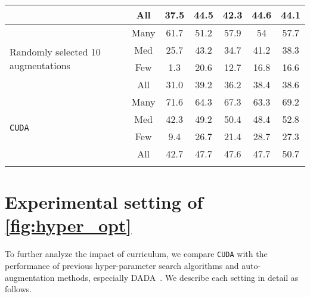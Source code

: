 \documentclass{article}
\def\code#1{\texttt{#1}}
\newcommand{\thickhline}{\hlineB{4}}
\newcommand{\alg}{\code{CUDA}\xspace}
\renewcommand*\cite[1]{\citep{#1}}
\begin{document}
{\begin{table}[ht]
{{\begin{tabular}{l|c|ccccc}
                           & All                  & 37.5                   & 44.5                       & 42.3                         & 44.6                   & 44.1                     \\ \midrule
\multirow{4}{*}{Randomly selected 10 augmentations} & Many                 & 61.7                   & 51.2                       & 57.9                         & 54                     & 57.7                     \\
                           & Med                  & 25.7                   & 43.2                       & 34.7                         & 41.2                   & 38.3                     \\
                           & Few                  & 1.3                    & 20.6                       & 12.7                         & 16.8                   & 16.6                     \\
                           & All                  & 31.0                     & 39.2                       & 36.2                         & 38.4                   & 38.6                     \\ \midrule
\multirow{4}{*}{\alg}      & Many                 & 71.6                   & 64.3                       & 67.3                         & 63.3                   & 69.2                     \\
                           & Med                  & 42.3                   & 49.2                       & 50.4                         & 48.4                   & 52.8                     \\
                           & Few                  & 9.4                    & 26.7                       & 21.4                         & 28.7                   & 27.3                     \\
                           & All                  & 42.7                   & 47.7                       & 47.6                         & 47.7                   & 50.7                    \\
\thickhline
\end{tabular}}}
\end{table} } 
\section{Experimental setting of \autoref{fig:hyper_opt}}
\label{app:hyperopt}
To further analyze the impact of curriculum, we compare \alg with the performance of previous hyper-parameter search algorithms and auto-augmentation methods, especially DADA~\cite{li2020dada}. We describe each setting in detail as follows.
\end{document}
